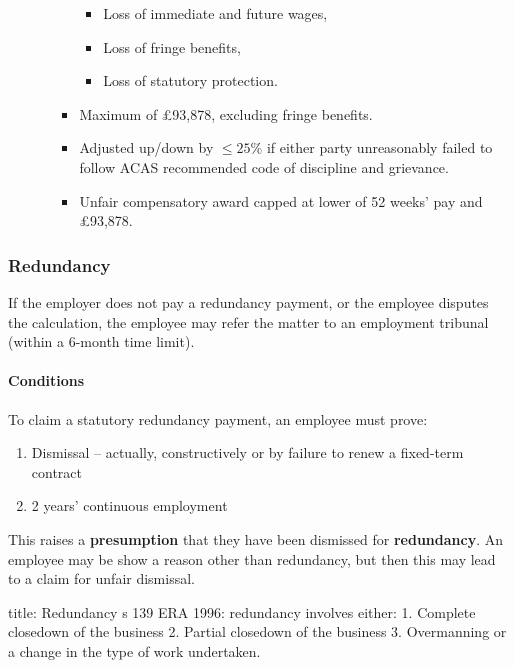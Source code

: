 \documentclass[
]{article}
\newenvironment{Shaded}{}{}
\newcommand{\NormalTok}[1]{#1}
\providecommand{\tightlist}{%
  \setlength{\itemsep}{0pt}\setlength{\parskip}{0pt}}
\begin{document}
\begin{itemize}
\begin{itemize}
\begin{itemize}
      \begin{itemize}
      \tightlist
      \item
        Loss of immediate and future wages,
      \item
        Loss of fringe benefits,
      \item
        Loss of statutory protection.
      \end{itemize}
    \item
      Maximum of £93,878, excluding fringe benefits.
    \item
      Adjusted up/down by \(\leq 25\%\) if either party unreasonably
      failed to follow ACAS recommended code of discipline and
      grievance.
    \item
      Unfair compensatory award capped at lower of 52 weeks' pay and
      £93,878.
    \end{itemize}
  \end{itemize}
\end{itemize}

\hypertarget{redundancy}{%
\subsubsection{Redundancy}\label{redundancy}}

If the employer does not pay a redundancy payment, or the employee
disputes the calculation, the employee may refer the matter to an
employment tribunal (within a 6-month time limit).

\hypertarget{conditions}{%
\paragraph{Conditions}\label{conditions}}

To claim a statutory redundancy payment, an employee must prove:

\begin{enumerate}
\def\labelenumi{\arabic{enumi}.}
\tightlist
\item
  Dismissal -- actually, constructively or by failure to renew a
  fixed-term contract
\item
  2 years' continuous employment
\end{enumerate}

This raises a \textbf{presumption} that they have been dismissed for
\textbf{redundancy}. An employee may be show a reason other than
redundancy, but then this may lead to a claim for unfair dismissal.

\begin{Shaded}
\begin{Highlighting}[]
\NormalTok{title: Redundancy}
\NormalTok{s 139 ERA 1996: redundancy involves either:}
\NormalTok{1. Complete closedown of the business}
\NormalTok{2. Partial closedown of the business}
\NormalTok{3. Overmanning or a change in the type of work undertaken.}
\end{Highlighting}
\end{Shaded}
\end{document}
